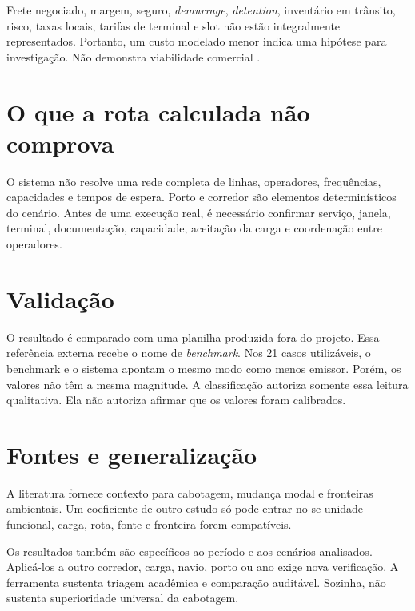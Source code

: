 Frete negociado, margem, seguro, \emph{demurrage}, \emph{detention}, inventário em trânsito, risco, taxas locais, tarifas de terminal e slot não estão integralmente representados. Portanto, um custo modelado menor indica uma hipótese para investigação. Não demonstra viabilidade comercial \cite{competitiveness2024,modalshiftreview2020}.

\section{O que a rota calculada não comprova}
\label{sec:limitacao-operacional}

O sistema não resolve uma rede completa de linhas, operadores, frequências, capacidades e tempos de espera. Porto e corredor são elementos determinísticos do cenário. Antes de uma execução real, é necessário confirmar serviço, janela, terminal, documentação, capacidade, aceitação da carga e coordenação entre operadores.

\section{Validação}
\label{sec:limitacao-validacao}

O resultado é comparado com uma planilha produzida fora do projeto. Essa referência externa recebe o nome de \emph{benchmark}. Nos 21 casos utilizáveis, o benchmark e o sistema apontam o mesmo modo como menos emissor. Porém, os valores não têm a mesma magnitude. A classificação  autoriza somente essa leitura qualitativa. Ela não autoriza afirmar que os valores foram calibrados.

\section{Fontes e generalização}
\label{sec:limitacao-fontes-generalizacao}

A literatura fornece contexto para cabotagem, mudança modal e fronteiras ambientais. Um coeficiente de outro estudo só pode entrar no \CabotageLens{} se unidade funcional, carga, rota, fonte e fronteira forem compatíveis.

Os resultados também são específicos ao período e aos cenários analisados. Aplicá-los a outro corredor, carga, navio, porto ou ano exige nova verificação. A ferramenta sustenta triagem acadêmica e comparação auditável. Sozinha, não sustenta superioridade universal da cabotagem.
